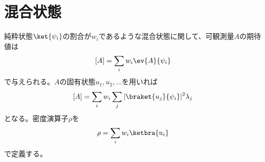 \section{混合状態}

純粋状態$\ket{\psi_i}$の割合が$w_i$であるような混合状態に関して、可観測量$A$の期待値は
    \[[A] = \sum_i w_i\ev{A}{\psi_i}\]
で与えられる。$A$の固有状態$u_1, u_2, \dots$を用いれば
    \[[A] = \sum_i w_i \sum_j |\braket{u_j}{\psi_i}|^2\lambda_j\]
となる。密度演算子$\rho$を
    \[\rho = \sum_i w_i\ketbra{u_i}\]
で定義する。
